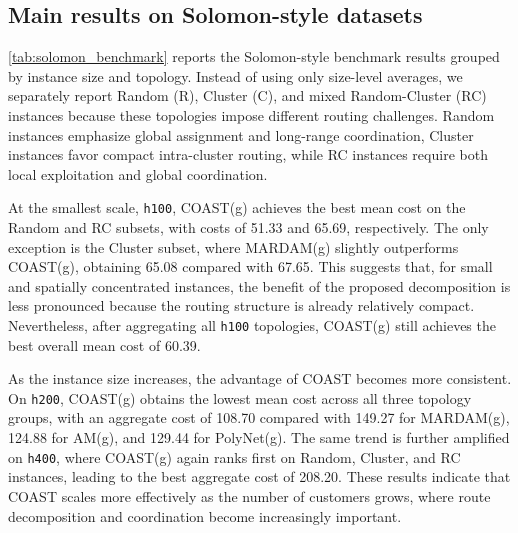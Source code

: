 \documentclass[conference]{IEEEtran}
\begin{document}
\begin{table}[t]
\centering
\caption{Neural model configurations used in the experiments. The first row lists COAST and its internal ablations, which share the same backbone architecture. The subsequent rows list external neural baselines with comparable or stronger capacity.}
\label{tab:model_config}
\scriptsize
{}
\vspace{1mm}
\end{table}



\subsection{Main results on Solomon-style datasets}

\autoref{tab:solomon_benchmark} reports the Solomon-style benchmark results grouped by instance size and topology. Instead of using only size-level averages, we separately report Random (R), Cluster (C), and mixed Random-Cluster (RC) instances because these topologies impose different routing challenges. Random instances emphasize global assignment and long-range coordination, Cluster instances favor compact intra-cluster routing, while RC instances require both local exploitation and global coordination.

At the smallest scale, \texttt{h100}, COAST(g) achieves the best mean cost on the Random and RC subsets, with costs of 51.33 and 65.69, respectively. The only exception is the Cluster subset, where MARDAM(g) slightly outperforms COAST(g), obtaining 65.08 compared with 67.65. This suggests that, for small and spatially concentrated instances, the benefit of the proposed decomposition is less pronounced because the routing structure is already relatively compact. Nevertheless, after aggregating all \texttt{h100} topologies, COAST(g) still achieves the best overall mean cost of 60.39.

As the instance size increases, the advantage of COAST becomes more consistent. On \texttt{h200}, COAST(g) obtains the lowest mean cost across all three topology groups, with an aggregate cost of 108.70 compared with 149.27 for MARDAM(g), 124.88 for AM(g), and 129.44 for PolyNet(g). The same trend is further amplified on \texttt{h400}, where COAST(g) again ranks first on Random, Cluster, and RC instances, leading to the best aggregate cost of 208.20. These results indicate that COAST scales more effectively as the number of customers grows, where route decomposition and coordination become increasingly important.
\end{document}
